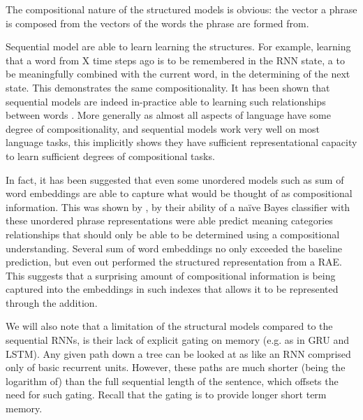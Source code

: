 \documentclass[12pt,parskip]{komatufte}
\begin{document}
The compositional nature of the structured models is obvious:
the vector a phrase is composed from the vectors of the words the phrase are formed from.

Sequential model are able to learn learning the structures.
For example, learning that a word from X time steps ago is to be remembered in the RNN state, a to be meaningfully combined with the current word, in the determining of the next state.
This demonstrates the same compositionality.
It has been shown that sequential models are indeed in-practice able to learning such relationships between words .
More generally as almost all aspects of language have some degree of compositionality, and sequential models work very well on most language tasks, this implicitly shows they have sufficient representational capacity to learn sufficient degrees of compositional tasks.


In fact, it has been suggested that even some unordered models such as sum of word embeddings are able to capture what would be thought of as compositional information.
This was shown by \textcite{RitterPosition}, by their ability of a na\"ive Bayes classifier with these unordered phrase representations were able predict meaning categories relationships that should only be able to be determined using a compositional understanding.
Several  sum of word embeddings no only exceeded the baseline prediction, but even out performed the structured representation from a RAE.
This suggests that a surprising amount of compositional information is being captured into the embeddings in such indexes that allows it to be represented through the addition.

We will also note that a limitation of the structural models compared to the sequential RNNs,
is their lack of explicit gating on memory (e.g. as in GRU and LSTM).
Any given path down a tree can be looked at as like an RNN comprised only of basic recurrent units.
However, these paths are much shorter (being the logarithm of) than the full sequential length of the sentence,
which offsets the need for such gating.
Recall that the gating is to provide longer short term memory.
\end{document}
